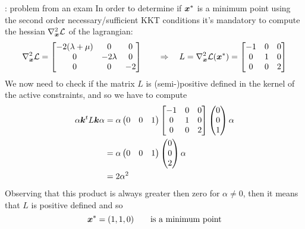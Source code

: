 \begin{example}{: problem from an exam}
		In order to determine if $\boldsymbol{x}^*$ is a minimum point using the second order necessary/sufficient KKT conditions it's mandatory to compute the hessian $\nabla^2_{\boldsymbol{x}} \mathcal L$ of the lagrangian:
		\[ \nabla^2_{\boldsymbol{x}} \mathcal L = \begin{bmatrix}
			-2(\lambda+\mu) & 0 & 0 \\ 0 & -2\lambda & 0 \\ 0 & 0 & - 2
		\end{bmatrix} \qquad \Rightarrow \quad L = \nabla^2_{\boldsymbol{x}} \mathcal L(\boldsymbol{x}^*) = \begin{bmatrix}
			-1 & 0 & 0 \\ 0 & 1 & 0 \\ 0 & 0 & 2
		\end{bmatrix}  \]
		We now need to check if the matrix $L$ is (semi-)positive defined in the kernel of the active constraints, and so we have to compute
		\begin{align*}
			\alpha\boldsymbol{k}^t L \boldsymbol{k} \alpha & = \alpha \begin{pmatrix} 0 & 0 & 1 \end{pmatrix} \begin{bmatrix}
				-1 & 0 & 0 \\ 0 & 1 & 0 \\ 0 & 0 & 2
			\end{bmatrix} \begin{pmatrix}  0 \\0 \\ 1  \end{pmatrix} \alpha \\
		 	& = \alpha \begin{pmatrix} 0 & 0 & 1 \end{pmatrix} \begin{pmatrix} 0 \\ 0 \\ 2 \end{pmatrix} \alpha \\
		 	& = 2\alpha^2
		\end{align*}
		Observing that this product is always greater then zero for $\alpha \neq 0$, then it means that $L$ is positive defined and so
		\[ \boldsymbol{x}^* = (1,1,0) \qquad \textrm{is a minimum point} \]	
	\end{example}
	
	
	
	
	
	
	
	
	
	
	
	
	
	
	
	
	
	
	
	
	
	
	
	
	
	
	
	
	
	
	
	
	
	
	
	
	
	
	
	